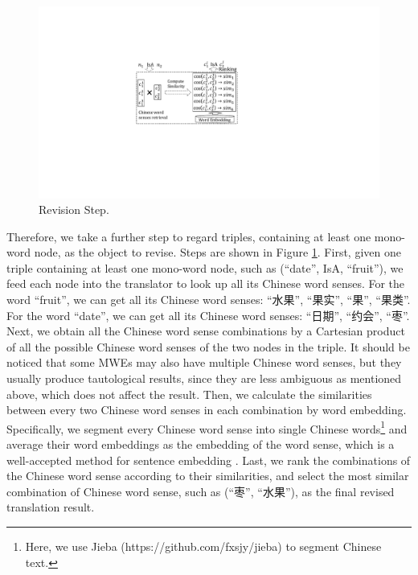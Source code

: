 \begin{figure}[!htbp]
	\centering
	\includegraphics[width=\columnwidth]{figures/revision}
	\caption{Revision Step.}
	\label{fig:revision}
\end{figure}
Therefore, we take a further step to regard triples, containing at least one mono-word node, as the object to revise. 
Steps are shown in Figure \ref{fig:revision}. 
First, given one triple containing at least one mono-word node, such as (``date'', IsA, ``fruit''), 
we feed each node into the translator to look up all its Chinese word senses.
For the word ``fruit'', we can get all its Chinese word senses: ``水果'', ``果实'', ``果'', ``果类''. 
For the word ``date'', we can get all its Chinese word senses: ``日期'', ``约会'', ``枣''. 
Next, we obtain all the Chinese word sense combinations by a Cartesian product of all the possible Chinese word senses of the two nodes in the triple. It should be noticed that some MWEs may also have multiple Chinese word senses, but they usually produce tautological results, since they are less ambiguous as mentioned above, which does not affect the result.
Then, we calculate the similarities between every two Chinese word senses in each combination by word embedding.
Specifically, we segment every Chinese word sense into single Chinese words\footnote{Here, we use Jieba (https://github.com/fxsjy/jieba) to segment Chinese text.} and average their word embeddings as the embedding of the word sense, which is a well-accepted method for sentence embedding \cite{wieting2015towards,Shen2018}. 
Last, we rank the combinations of the Chinese word sense according to their similarities,
and select the most similar combination of Chinese word sense, such as (``枣'', ``水果''), as the final revised translation result.
